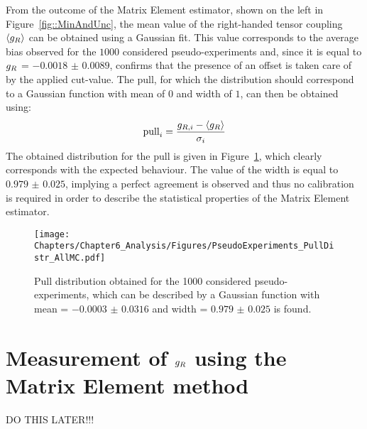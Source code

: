 From the outcome of the Matrix Element estimator, shown on the left in Figure~\ref{fig::MinAndUnc}, the mean value of the right-handed tensor coupling $\left\langle g_{R} \right\rangle$ can be obtained using a Gaussian fit.
This value corresponds to the average bias observed for the $1 000$ considered pseudo-experiments and, since it is equal to $g_{R}$ = $-0.0018$ $\pm$ $0.0089$, confirms that the presence of an offset is taken care of by the applied cut-value.
The pull, for which the distribution should correspond to a Gaussian function with mean of $0$ and width of $1$, can then be obtained using:
\begin{equation}
 \textrm{pull}_{i} = \frac{g_{R,i} - \left\langle g_{R} \right\rangle}{\sigma_{i}}
\end{equation}
The obtained distribution for the pull is given in Figure~\ref{fig::PullDistr}, which clearly corresponds with the expected behaviour.
The value of the width is equal to $0.979$ $\pm$ $0.025$, implying a perfect agreement is observed and thus no calibration is required in order to describe the statistical properties of the Matrix Element estimator.
\newpage
\begin{figure}[h!t]
 \centering
 \texttt{[image: Chapters/Chapter6\_Analysis/Figures/PseudoExperiments\_PullDistr\_AllMC.pdf]}
 \caption{Pull distribution obtained for the 1000 considered pseudo-experiments, which can be described by a Gaussian function with mean = $-0.0003$ $\pm$ $0.0316$ and width = $0.979$ $\pm$ $0.025$ is found.} \label{fig::PullDistr}
\end{figure}

\newpage
\section{Measurement of $g_{R}$ using the Matrix Element method} \label{sec::gRMeas}
DO THIS LATER!!!

